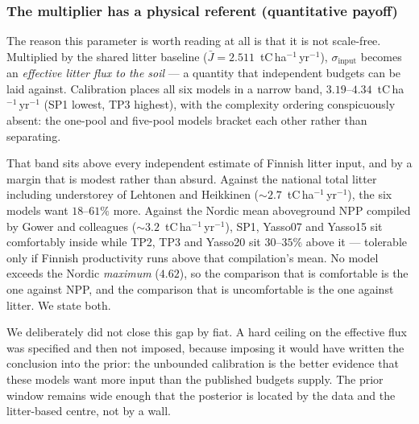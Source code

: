\documentclass[11pt]{article}
\begin{document}
\subsubsection{The multiplier has a physical referent (quantitative payoff)}
%
The reason this parameter is worth reading at all is that it is not scale-free.
Multiplied by the shared litter baseline
($\bar J = 2.511$~tC\,ha$^{-1}$\,yr$^{-1}$), $\sigma_{\mathrm{input}}$ becomes an
\emph{effective litter flux to the soil} --- a quantity that independent budgets
can be laid against. Calibration places all six models in a narrow band,
$3.19$--$4.34$~tC\,ha$^{-1}$\,yr$^{-1}$ (SP1 lowest, TP3 highest), with the
complexity ordering conspicuously absent: the one-pool and five-pool models
bracket each other rather than separating.

That band sits above every independent estimate of Finnish litter input, and by
a margin that is modest rather than absurd. Against the national total litter
including understorey of Lehtonen and Heikkinen ($\sim\!2.7$~tC\,ha$^{-1}$\,yr$^{-1}$),
the six models want $18$--$61\%$ more. Against the Nordic mean aboveground NPP
compiled by Gower and colleagues ($\sim\!3.2$~tC\,ha$^{-1}$\,yr$^{-1}$), SP1,
Yasso07 and Yasso15 sit comfortably inside while TP2, TP3 and Yasso20 sit
$30$--$35\%$ above it --- tolerable only if Finnish productivity runs above that
compilation's mean. No model exceeds the Nordic \emph{maximum} ($4.62$), so the
comparison that is comfortable is the one against NPP, and the comparison that
is uncomfortable is the one against litter. We state both.

We deliberately did not close this gap by fiat. A hard ceiling on the effective
flux was specified and then not imposed, because imposing it would have written
the conclusion into the prior: the unbounded calibration is the better evidence
that these models want more input than the published budgets supply. The prior
window remains wide enough that the posterior is located by the data and the
litter-based centre, not by a wall.
\end{document}
